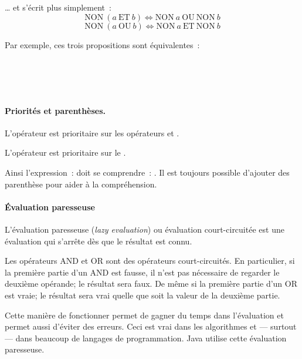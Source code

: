 				… et s'écrit plus simplement~:
				\[
					\mathrm{NON}\ (a\ \mathrm{ET}\ b) \Leftrightarrow \mathrm{NON}\ a\ \mathrm{OU}\ \mathrm{NON}\ b
				\]
				\[
					\mathrm{NON}\ (a\ \mathrm{OU}\ b) \Leftrightarrow \mathrm{NON}\ a\ \mathrm{ET}\ \mathrm{NON}\ b
				\]
				
				Par exemple, ces trois propositions sont équivalentes~: 
				
				\begin{center}	
					\large
				\\
				\medskip
				\\
				\medskip
				\\
				\end{center}
	
			\paragraph{Priorités et parenthèses.}
				L'opérateur  est prioritaire sur les opérateurs 
				et .

				L'opérateur  est prioritaire sur le .
				
				Ainsi l’expression~: 
				doit se comprendre~: .
				Il est toujours possible d'ajouter des parenthèse pour aider 
				à la compréhension. 

				\paragraph{Évaluation paresseuse} 
				\label{court-circuit}
			
				L'évaluation paresseuse (\textit{lazy evaluation}) ou évaluation
				court-circuitée est une évaluation qui s'arrête dès que le 
				résultat est connu. 
			
				Les opérateurs AND et OR sont des opérateurs court-circuités.
				En particulier, si la première partie d’un AND est fausse, il
				n'est pas nécessaire de regarder le deuxième opérande; le
				résultat sera faux. De même si la première partie d'un OR est
				vraie; le résultat sera vrai quelle que soit la valeur de la
				deuxième partie. 

				Cette manière de fonctionner permet de gagner du temps dans
				l'évaluation et permet aussi d'éviter des erreurs. Ceci est vrai
				dans les algorithmes et — surtout — dans beaucoup de langages 
				de programmation. Java utilise cette évaluation paresseuse.  
				 
